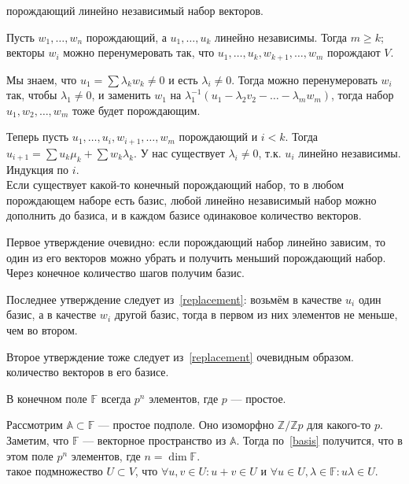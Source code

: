 \documentclass[12pt,a4paper]{article}
\begin{document}
 порождающий линейно независимый набор векторов.

 Пусть $w_1,\ldots ,w_n$ порождающий, а $u_1,\ldots ,u_k$ линейно независимы. Тогда $m\geq k$; векторы $w_i$ можно перенумеровать так, что $u_1,\ldots ,u_k,w_{k+1},\ldots ,w_m$ порождают $V$.\label{replacement}

\proof Мы знаем, что $u_1=\sum \lambda_kw_k\neq 0$ и есть $\lambda_i\neq 0$. Тогда можно перенумеровать $w_i$ так, чтобы $\lambda_1\neq 0$, и заменить $w_1$ на $\lambda_1^{-1}(u_1-\lambda_2v_2-\ldots -\lambda_mw_m)$, тогда набор $u_1,w_2,\ldots ,w_m$ тоже будет порождающим.

Теперь пусть $u_1,\ldots ,u_i,w_{i+1},\ldots ,w_m$ порождающий и $i<k$. Тогда $u_{i+1}=\sum u_k\mu_k+\sum w_k\lambda_k$. У нас существует $\lambda_i\neq 0$, т.к. $u_i$ линейно независимы. Индукция по $i$. \QEDA\\

 Если существует какой-то конечный порождающий набор, то в любом порождающем наборе есть базис, любой линейно независимый набор можно дополнить до базиса, и в каждом базисе одинаковое количество векторов.\label{basis}

\proof Первое утверждение очевидно: если порождающий набор линейно зависим, то один из его векторов можно убрать и получить меньший порождающий набор. Через конечное количество шагов получим базис.

Последнее утверждение следует из~\ref{replacement}: возьмём в качестве $u_i$ один базис, а в качестве $w_i$ другой базис, тогда в первом из них элементов не меньше, чем во втором.

Второе утверждение тоже следует из~\ref{replacement} очевидным образом.\QEDA\\

 количество векторов в его базисе.

\theorem В конечном поле $\mathbb F $ всегда $p^n$ элементов, где $p$ --- простое.

\proof Рассмотрим $\mathbb A \subset \mathbb F $ --- простое подполе. Оно изоморфно $\mathbb Z /\mathbb Z p$ для какого-то $p$. Заметим, что $\mathbb F $ --- векторное пространство из $\mathbb A$. Тогда по~\ref{basis} получится, что в этом поле $p^n$ элементов, где $n=\dim \mathbb F $. \QEDA\\

 такое подмножество $U\subset V$, что $\forall u,v\in U:u+v\in U$ и $\forall u\in U,\lambda\in \mathbb F :u\lambda\in U$.
\end{document}
